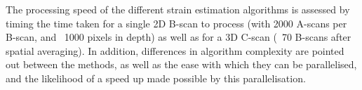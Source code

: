 The processing speed of the different strain estimation algorithms is assessed by timing the time taken for a single 2D B-scan to process (with 2000 A-scans per B-scan, and ~1000 pixels in depth) as well as for a 3D C-scan (~70 B-scans after spatial averaging). In addition, differences in algorithm complexity are pointed out between the methods, as well as the ease with which they can be parallelised, and the likelihood of a speed up made possible by this parallelisation.
